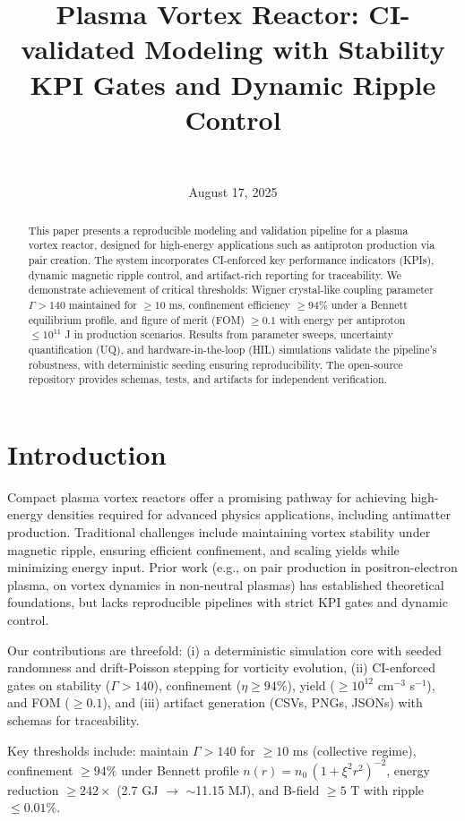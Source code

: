 \documentclass[11pt]{article}
\title{Plasma Vortex Reactor: CI-validated Modeling with Stability KPI Gates and Dynamic Ripple Control}
\author{\authorname\\\texttt{\authoremail}}
\date{August 17, 2025}
\begin{document}
\maketitle
\begin{abstract}
This paper presents a reproducible modeling and validation pipeline for a plasma vortex reactor, designed for high-energy applications such as antiproton production via pair creation. The system incorporates CI-enforced key performance indicators (KPIs), dynamic magnetic ripple control, and artifact-rich reporting for traceability. We demonstrate achievement of critical thresholds: Wigner crystal-like coupling parameter $\Gamma > 140$ maintained for $\geq 10$ ms, confinement efficiency $\geq 94\%$ under a Bennett equilibrium profile, and figure of merit (FOM) $\geq 0.1$ with energy per antiproton $\leq 10^{11}$ J in production scenarios. Results from parameter sweeps, uncertainty quantification (UQ), and hardware-in-the-loop (HIL) simulations validate the pipeline's robustness, with deterministic seeding ensuring reproducibility. The open-source repository provides schemas, tests, and artifacts for independent verification.
\end{abstract}
\section{Introduction}
Compact plasma vortex reactors offer a promising pathway for achieving high-energy densities required for advanced physics applications, including antimatter production. Traditional challenges include maintaining vortex stability under magnetic ripple, ensuring efficient confinement, and scaling yields while minimizing energy input. Prior work (e.g., \cite{arxiv2207.09093} on pair production in positron-electron plasma, \cite{arxiv2501.13940} on vortex dynamics in non-neutral plasmas) has established theoretical foundations, but lacks reproducible pipelines with strict KPI gates and dynamic control.

Our contributions are threefold: (i) a deterministic simulation core with seeded randomness and drift-Poisson stepping for vorticity evolution, (ii) CI-enforced gates on stability ($\Gamma > 140$), confinement ($\eta \geq 94\%$), yield ($\geq 10^{12}$ cm$^{-3}$ s$^{-1}$), and FOM ($\geq 0.1$), and (iii) artifact generation (CSVs, PNGs, JSONs) with schemas for traceability. 

Key thresholds include: maintain $\Gamma > 140$ for $\geq 10$ ms (collective regime), confinement $\geq 94\%$ under Bennett profile $n(r)=n_0\,(1+\xi^2 r^2)^{-2}$, energy reduction $\geq 242\times$ (2.7 GJ $\to$ $\sim$11.15 MJ), and B-field $\geq 5$ T with ripple $\leq 0.01\%$.
\end{document}
